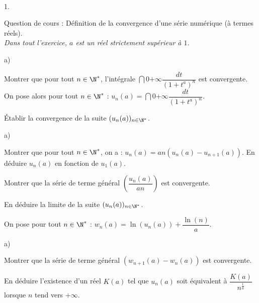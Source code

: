 \documentclass[11pt]{article}%
\begin{document}
\begin{exerciceAP}~
  \begin{noliste}{1.}
    \setlength{\itemsep}{2mm}
  \item Question de cours : Définition de la convergence d'une série
    numérique (à termes réels).\\
    {\it Dans tout l'exercice, $a$ est un réel strictement supérieur à
      $1$.}
  \item
    \begin{noliste}{a)}
    \setlength{\itemsep}{2mm}
    \item Montrer que pour tout $n\in\N^*$, l'intégrale
      $\dint{0}{+\infty} \dfrac{dt}{(1+t^a)^n}$ est convergente. On
      pose alors pour tout $n\in\N^*$ : $u_n(a)=\dint{0}{+\infty}
      \dfrac{dt}{(1+t^a)^n}$.
    \item Établir la convergence de la suite $(u_n(a))_{n\in\N^*}$.
    \end{noliste}

  \item
    \begin{noliste}{a)}
    \setlength{\itemsep}{2mm}
    \item Montrer que pour tout $n\in\N^*$, on a :
      $u_n(a)=an(u_n(a)-u_{n+1}(a))$. En déduire $u_n(a)$ en fonction
      de $u_1(a)$.
    \item Montrer que la série de terme général
      $\left(\dfrac{u_n(a)}{an}\right)$ est convergente.
    \item En déduire la limite de la suite $(u_n(a))_{n\in\N^*}$.
    \end{noliste}

  \item On pose pour tout $n\in\N^*$ :
    $w_n(a)=\ln(u_n(a))+\dfrac{\ln(n)}{a}$.
    \begin{noliste}{a)}
    \setlength{\itemsep}{2mm}
    \item Montrer que la série de terme général $(w_{n+1}(a)-w_n(a))$
      est convergente.
    \item En déduire l'existence d'un réel $K(a)$ tel que $u_n(a)$
      soit équivalent à $\dfrac{K(a)}{n^{\frac{1}{a}}}$ lorsque $n$
      tend vers $+\infty$.
    \end{noliste}
  \end{noliste}
\end{exerciceAP}
\end{document}
